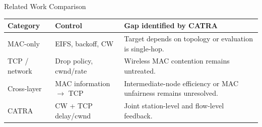\begin{frame}{Related Work Comparison}
\begin{tabular}{>{\raggedright\arraybackslash}p{2.1cm}>{\raggedright\arraybackslash}p{3.3cm}>{\raggedright\arraybackslash}p{5.1cm}}
\toprule
\textbf{Category} & \textbf{Control} & \textbf{Gap identified by CATRA} \\
\midrule
MAC-only & EIFS, backoff, CW & Target depends on topology or evaluation is single-hop. \\
TCP / network & Drop policy, cwnd/rate & Wireless MAC contention remains untreated. \\
Cross-layer & MAC information $\rightarrow$ TCP & Intermediate-node efficiency or MAC unfairness remains unresolved. \\
CATRA & CW + TCP delay/cwnd & Joint station-level and flow-level feedback. \\
\bottomrule
\end{tabular}
\end{frame}
